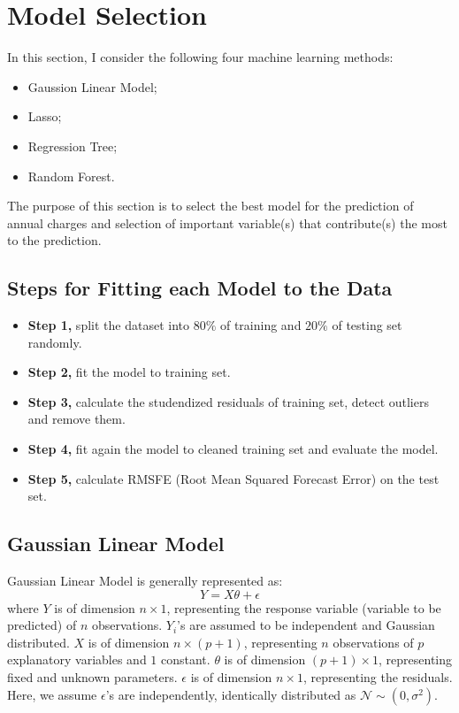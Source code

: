 \documentclass{article}
\begin{document}
\section{Model Selection}

In this section, I consider the following four machine learning methods:
\begin{itemize}
	\item Gaussion Linear Model;
	\item Lasso;
	\item Regression Tree;
	\item Random Forest.
\end{itemize}
The purpose of this section is to select the best model for the prediction of annual charges and selection of important variable(s) that contribute(s) the most to the prediction.

\subsection{Steps for Fitting each Model to the Data}
\begin{itemize}
	\renewcommand{\labelitemi}{--}
	\item \textbf{Step 1,} split the dataset into $80\%$ of training and $20\%$ of testing set randomly.
	\item \textbf{Step 2,} fit the model to training set.
	\item \textbf{Step 3,} calculate the studendized residuals of training set, detect outliers and remove them.
	\item \textbf{Step 4,} fit again the model to cleaned training set and evaluate the model.
	\item \textbf{Step 5,} calculate RMSFE (Root Mean Squared Forecast Error) on the test set.
\end{itemize}

\subsection{Gaussian Linear Model}
Gaussian Linear Model is generally represented as:
\begin{equation}
	\label{eq:glm}
	Y = X\theta + \epsilon
\end{equation}
where $Y$ is of dimension $n \times 1$, representing the response variable (variable to be predicted) of $n$ observations. $Y_i$'s are assumed to be independent and Gaussian distributed. $X$ is of dimension $n \times \left(p + 1\right)$, representing $n$ observations of $p$ explanatory variables and $1$ constant.  $\theta$ is of dimension $\left(p + 1\right) \times 1$, representing fixed and unknown parameters. $\epsilon$ is of dimension $n \times 1$, representing the residuals. Here, we assume $\epsilon$'s are independently, identically distributed as $\mathcal{N} \sim \left(0,\sigma^2\right)$.
\end{document}
